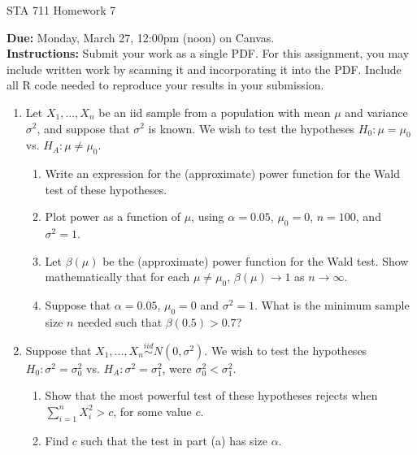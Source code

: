 \documentclass[11pt]{article}
\begin{document}
\begin{center}
\Large
STA 711 Homework 7\\
\normalsize
\vspace{5mm}
\end{center}

\noindent \textbf{Due:} Monday, March 27, 12:00pm (noon) on Canvas.\\ 

\noindent \textbf{Instructions:} Submit your work as a single PDF. For this assignment, you may include written work by scanning it and incorporating it into the PDF. Include all R code needed to reproduce your results in your submission.


\begin{enumerate}
\item Let $X_1,...,X_n$ be an iid sample from a population with mean $\mu$ and variance $\sigma^2$, and suppose that $\sigma^2$ is known. We wish to test the hypotheses $H_0: \mu = \mu_0$ vs. $H_A: \mu \neq \mu_0$.

\begin{enumerate}
\item Write an expression for the (approximate) power function for the Wald test of these hypotheses.
\item Plot power as a function of $\mu$, using $\alpha = 0.05$, $\mu_0 = 0$, $n = 100$, and $\sigma^2 = 1$.
\item Let $\beta(\mu)$ be the (approximate) power function for the Wald test. Show mathematically that for each $\mu \neq \mu_0$, $\beta(\mu) \to 1$ as $n \to \infty$.
\item Suppose that $\alpha = 0.05$, $\mu_0 = 0$ and $\sigma^2 = 1$. What is the minimum sample size $n$ needed such that $\beta(0.5) > 0.7$?
\end{enumerate}

\item Suppose that $X_1,...,X_n \overset{iid}{\sim} N(0, \sigma^2)$. We wish to test the hypotheses $H_0: \sigma^2 = \sigma_0^2$ vs. $H_A: \sigma^2 = \sigma_1^2$, were $\sigma_0^2 < \sigma_1^2$.

\begin{enumerate}
\item Show that the most powerful test of these hypotheses rejects when $\sum \limits_{i=1}^n X_i^2 > c$, for some value $c$.
\item Find $c$ such that the test in part (a) has size $\alpha$.
\end{enumerate}


\end{enumerate}
\end{document}
